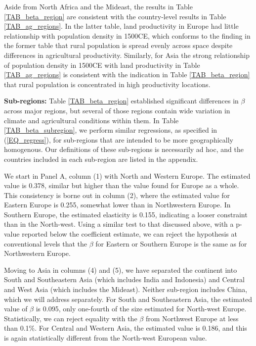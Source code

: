 \documentclass[11pt]{article}
\begin{document}
Aside from North Africa and the Mideast, the results in Table \ref{TAB_beta_region} are consistent with the country-level results in Table \ref{TAB_ag_regions}. In the latter table, land productivity in Europe had little relationship with population density in 1500CE, which conforms to the finding in the former table that rural population is spread evenly across space despite differences in agricultural productivity. Similarly, for Asia the strong relationship of population density in 1500CE with land productivity in Table \ref{TAB_ag_regions} is consistent with the indication in Table \ref{TAB_beta_region} that rural population is concentrated in high productivity locations.

\vspace{.5cm}\noindent\textbf{Sub-regions:} Table \ref{TAB_beta_region} established significant differences in $\beta$ across major regions, but several of those regions contain wide variation in climate and agricultural conditions within them. In Table \ref{TAB_beta_subregion}, we perform similar regressions, as specified in (\ref{EQ_regress}), for sub-regions that are intended to be more geographically homogenous. Our definitions of these sub-regions is necessarily ad hoc, and the countries included in each sub-region are listed in the appendix.

We start in Panel A, column (1) with North and Western Europe. The estimated value is 0.378, similar but higher than the value found for Europe as a whole. This consistency is borne out in column (2), where the estimated value for Eastern Europe is 0.255, somewhat lower than in Northwestern Europe. In Southern Europe, the estimated elasticity is 0.155, indicating a looser constraint than in the North-west. Using a similar test to that discussed above, with a p-value reported below the coefficient estimate, we can reject the hypothesis at conventional levels that the $\beta$ for Eastern or Southern Europe is the same as for Northwestern Europe. 

Moving to Asia in columns (4) and (5), we have separated the continent into South and Southeastern Asia (which includes India and Indonesia) and Central and West Asia (which includes the Mideast). Neither sub-region includes China, which we will address separately. For South and Southeastern Asia, the estimated value of $\beta$ is 0.095, only one-fourth of the size estimated for North-west Europe. Statistically, we can reject equality with the $\beta$ from Northwest Europe at less than 0.1\%. For Central and Western Asia, the estimated value is 0.186, and this is again statistically different from the North-west European value.
\end{document}
